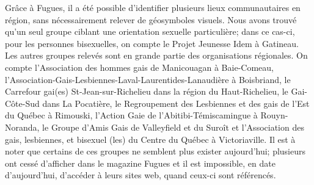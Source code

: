 Grâce à Fugues, il a été possible d'identifier plusieurs lieux communautaires en région, sans nécessairement relever de géosymboles visuels.
Nous avons trouvé qu'un seul groupe ciblant une orientation sexuelle particulière; dans ce cas-ci, pour les personnes bisexuelles, on compte le Projet Jeunesse Idem à Gatineau. 
Les autres groupes relevés sont en grande partie des organisations régionales. 
On compte l'Association des hommes gais de Manicouagan à Baie-Comeau, l'Association-Gais-Lesbiennes-Laval-Laurentides-Lanaudière à Boisbriand, le Carrefour gai(es) St-Jean-sur-Richelieu dans la région du Haut-Richelieu, le Gai-Côte-Sud dans La Pocatière, le Regroupement des Lesbiennes et des gais de l'Est du Québec à Rimouski, l'Action Gaie de l'Abitibi-Témiscamingue à Rouyn-Noranda, le Groupe d'Amis Gais de Valleyfield et du Suroît et l'Association des gais, lesbiennes, et bisexuel (les) du Centre du Québec à Victoriaville.
Il est à noter que certains de ces groupes ne semblent plus exister aujourd'hui; plusieurs ont cessé d'afficher dans le magazine Fugues et il est impossible, en date d'aujourd'hui, d'accéder à leurs sites web, quand ceux-ci sont référencés.


